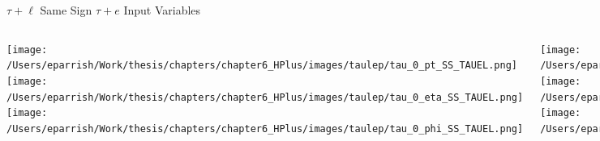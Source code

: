 \documentclass[aspectratio=169,xcolor=table]{beamer}
\begin{document}
    \begin{frame}[t]{$\tau+\ell$ Same Sign $\tau+e$ Input Variables}
      \begin{columns}[t]
          \texttt{[image: /Users/eparrish/Work/thesis/chapters/chapter6\_HPlus/images/taulep/tau\_0\_pt\_SS\_TAUEL.png]}
          \texttt{[image: /Users/eparrish/Work/thesis/chapters/chapter6\_HPlus/images/taulep/tau\_0\_eta\_SS\_TAUEL.png]}
          \texttt{[image: /Users/eparrish/Work/thesis/chapters/chapter6\_HPlus/images/taulep/tau\_0\_phi\_SS\_TAUEL.png]}

          \texttt{[image: /Users/eparrish/Work/thesis/chapters/chapter6\_HPlus/images/taulep/met\_et\_SS\_TAUEL.png]}
          \texttt{[image: /Users/eparrish/Work/thesis/chapters/chapter6\_HPlus/images/taulep/met\_phi\_SS\_TAUEL.png]}
          \texttt{[image: /Users/eparrish/Work/thesis/chapters/chapter6\_HPlus/images/taulep/jet\_1\_pt\_SS\_TAUEL.png]}

          \texttt{[image: /Users/eparrish/Work/thesis/chapters/chapter6\_HPlus/images/taulep/bjet\_0\_pt\_SS\_TAUEL.png]}
          \texttt{[image: /Users/eparrish/Work/thesis/chapters/chapter6\_HPlus/images/taulep/bjet\_0\_eta\_SS\_TAUEL.png]}
          \texttt{[image: /Users/eparrish/Work/thesis/chapters/chapter6\_HPlus/images/taulep/bjet\_0\_phi\_SS\_TAUEL.png]}

          \texttt{[image: /Users/eparrish/Work/thesis/chapters/chapter6\_HPlus/images/taulep/tau\_0\_upsilon\_SS\_TAUEL.png]}
          \texttt{[image: /Users/eparrish/Work/thesis/chapters/chapter6\_HPlus/images/taulep/tau\_0\_charged\_tracks\_0\_pt\_SS\_TAUEL.png]}

      \end{columns}
    \end{frame}
\end{document}
